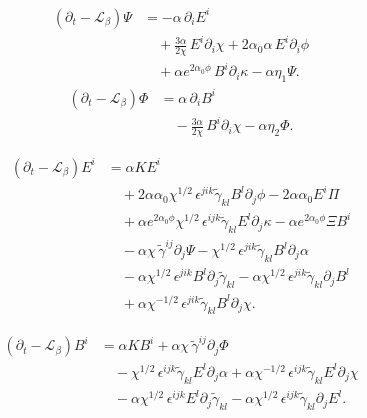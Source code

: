 \begin{equation}
\begin{aligned}
(\partial_t - \mathcal{L}_{\beta}) \Psi
&= - \alpha\, \partial_i E^i
\\[3pt]
&\quad
+ \frac{3\alpha}{2\chi}\, E^i \partial_i \chi
+ 2 \alpha_0 \alpha\, E^i \partial_i \phi
\\[3pt]
&\quad
+ \alpha e^{2\alpha_0 \phi}\, B^i \partial_i \kappa
- \alpha \eta_1 \Psi .
\end{aligned}
\end{equation}
\begin{equation}
\begin{aligned}
(\partial_t - \mathcal{L}_{\beta}) \Phi
&= \alpha\, \partial_i B^i
\\[3pt]
&\quad
- \frac{3\alpha}{2\chi}\, B^i \partial_i \chi
- \alpha \eta_2 \Phi .
\end{aligned}
\end{equation}


\begin{equation}
\begin{split}
(\partial_t - \mathcal{L}_{\beta}) E^i
&= \alpha K E^i
\\[4pt]
&\quad
+ 2 \alpha \alpha_0 \chi^{1/2}\,
  \epsilon^{jik}\tilde{\gamma}_{kl} B^l \partial_j \phi
- 2 \alpha \alpha_0 E^i \Pi
\\[6pt]
&\quad
+ \alpha e^{2\alpha_0 \phi} \chi^{1/2}\,
  \epsilon^{ijk}\tilde{\gamma}_{kl} E^l \partial_j \kappa
- \alpha e^{2\alpha_0 \phi} \Xi B^i
\\[6pt]
&\quad
- \alpha \chi\, \tilde{\gamma}^{ij} \partial_j \Psi
- \chi^{1/2}\, \epsilon^{jik}\tilde{\gamma}_{kl} B^l \partial_j \alpha
\\[4pt]
&\quad
- \alpha \chi^{1/2}\, \epsilon^{jik} B^l \partial_j \tilde{\gamma}_{kl}
- \alpha \chi^{1/2}\, \epsilon^{jik}\tilde{\gamma}_{kl} \partial_j B^l
\\[4pt]
&\quad
+ \alpha \chi^{-1/2}\, \epsilon^{jik}\tilde{\gamma}_{kl} B^l \partial_j \chi .
\end{split}
\end{equation}

\begin{equation}
\begin{split}
(\partial_t - \mathcal{L}_\beta) B^i
&= \alpha K B^i
+ \alpha \chi\, \tilde{\gamma}^{ij} \partial_j \Phi
\\[6pt]
&\quad
- \chi^{1/2}\, \epsilon^{ijk}\tilde{\gamma}_{kl} E^l \partial_j \alpha
+ \alpha \chi^{-1/2}\, \epsilon^{ijk}\tilde{\gamma}_{kl} E^l \partial_j \chi
\\[4pt]
&\quad
- \alpha \chi^{1/2}\, \epsilon^{ijk} E^l \partial_j \tilde{\gamma}_{kl}
- \alpha \chi^{1/2}\, \epsilon^{ijk}\tilde{\gamma}_{kl} \partial_j E^l .
\end{split}
\end{equation}


